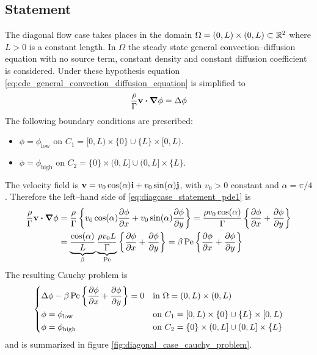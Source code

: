 
\subsection{Statement}

The diagonal flow case takes places in the domain $\Omega = (0,L) \times (0,L) \subset \mathbb{R}^2$ where $L > 0$ is a constant length. In $\Omega$ the steady state general convection--diffusion equation with no source term, constant density and constant diffusion coefficient is considered. Under these hypothesis equation \eqref{eq:cde_general_convection_diffusion_equation} is simplified to
\begin{equation} \label{eq:diagcase_statement_pde1}
	\frac{\rho}{\Gamma} \vb{v} \vdot \grad{\phi} = \Delta{\phi}
\end{equation}
The following boundary conditions are prescribed:
\begin{itemize}[topsep=0pt]
	\item $\phi = \phi_\text{low}$ on $C_1 = [0,L) \times \{ 0 \} \cup \{ L \} \times [0,L)$.
	\item $\phi = \phi_\text{high}$ on $C_2 = \{ 0 \} \times (0,L] \cup (0,L] \times \{ L \}$.
\end{itemize}
The velocity field is $\vb{v} = v_0 \cos(\alpha) \vb{i} + v_0 \sin(\alpha) \vb{j}$, with $v_0 > 0$ constant and $\alpha = \pi / 4$. Therefore the left--hand side of \eqref{eq:diagcase_statement_pde1} is
\begin{align}
	\frac{\rho}{\Gamma} \vb{v} \vdot \grad{\phi} &= 
	\frac{\rho}{\Gamma} 
	\left\{ v_0 \cos(\alpha) \pdv{\phi}{x} + v_0 \sin(\alpha) \pdv{\phi}{y} \right\} = 
	\frac{\rho v_0 \cos(\alpha)}{\Gamma} \left\{ \pdv{\phi}{x} + \pdv{\phi}{y} \right\} \\
	&= 
	\underbrace{\frac{\cos(\alpha)}{L}}_{\beta} 
	\underbrace{\frac{\rho v_0 L}{\Gamma}}_{\mathrm{Pe}} 
	\left\{ \pdv{\phi}{x} + \pdv{\phi}{y} \right\} = 
	\beta \, \mathrm{Pe} \left\{ \pdv{\phi}{x} + \pdv{\phi}{y} \right\}
\end{align}
The resulting Cauchy problem is
\begin{equation} \label{eq:diagonal_case_cauchy_problem}
	\left\{
	\begin{aligned}
		&\Delta \phi - \beta \, \mathrm{Pe} \left\{ \pdv{\phi}{x} + \pdv{\phi}{y} \right\} = 0 &
		&\text{in } \Omega = (0,L) \times (0,L) \\
		&\phi = \phi_\text{low} &
		&\text{on } C_1 = [0,L) \times \{ 0 \} \cup \{ L \} \times [0,L) \\
		&\phi = \phi_\text{high} &
		&\text{on } C_2 = \{ 0 \} \times (0,L] \cup (0,L] \times \{ L \}
	\end{aligned}
	\right.
\end{equation}
and is summarized in figure \ref{fig:diagonal_case_cauchy_problem}.

